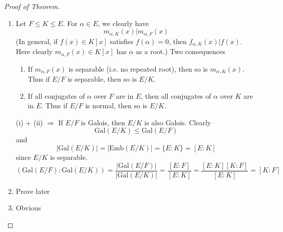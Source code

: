 \documentclass{article}
\theoremstyle{definition}
\newenvironment{proofs}[1][\proofname]{%
  \begin{proof}[#1]$ $\par\nobreak\ignorespaces
}{%
  \end{proof}
}
\newcommand{\Ra}{\Rightarrow}
\begin{document}
\begin{proofs}[Proof of Theorem]
	\begin{enumerate}
		\item[(1)] Let $F \leq K \leq E$.
			For $\alpha \in E$, we clearly have
			\[
				m_{\alpha, K}(x) | m_{\alpha, F}(x)
			\]
			(In general, if $f(x) \in K[x]$ satisfies $f(\alpha) = 0$, then $f_{\alpha, K}(x) | f(x)$.
			Here clearly $m_{\alpha, F}(x) \in K[x]$ has $\alpha$ as a root.)
			Two consequences
			\begin{enumerate}
				\item[(i)] If $m_{\alpha, F}(x)$ is separable (i.e. no repeated root), then so is $m_{\alpha, K}(x)$.
					Thus if $E/F$ is separable, then so is $E/K$.

				\item[(ii)] If all conjugates of $\alpha$ over $F$ are in $E$, then all conjugates of $\alpha$ over $K$ are in $E$.
					Thus if $E/F$ is normal, then so is $E/K$.
			\end{enumerate}
			(i) + (ii) $\Ra$ If $E/F$ is Galois, then $E/K$ is also Galois.
			Clearly 
			\[
				\text{Gal}(E/K) \leq \text{Gal}(E/F)
			\]
			and
			\[
				|\text{Gal}(E/K)| = |\text{Emb}(E/K)| = \{E:K\} = [E:K]
			\]
			since $E/K$ is separable.
			\[
				(\text{Gal}(E/F): \text{Gal}(E/K)) = \frac{|\text{Gal}(E/F)|}{|\text{Gal}(E/K)|} = \frac{[E:F]}{[E:K]} = \frac{[E:K][K:F]}{[E:K]} = [K:F]
			\]

		\item[(2)] Prove later

		\item[(3)] Obvious


\end{enumerate}
\end{proofs}
\end{document}
